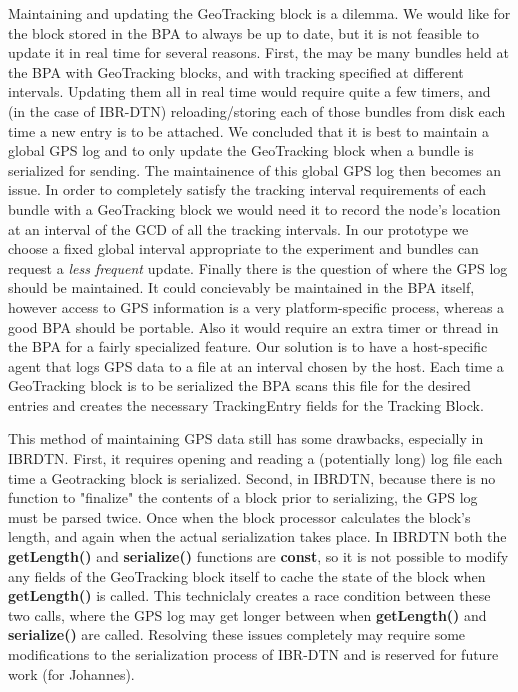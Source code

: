Maintaining and updating the GeoTracking block is a dilemma.  We would like for the block stored in the BPA to always be up to date, but it is not feasible to update it in real time for several reasons.  First, the may be many bundles held at the BPA with GeoTracking blocks, and with tracking specified at different intervals.  Updating them all in real time would require quite a few timers, and (in the case of IBR-DTN) reloading/storing each of those bundles from disk each time a new entry is to be attached.  We concluded that it is best to maintain a global GPS log and to only update the GeoTracking block when a bundle is serialized for sending.  The maintainence of this global GPS log then becomes an issue.  In order to completely satisfy the tracking interval requirements of each bundle with a GeoTracking block we would need it to record the node's location at an interval of the GCD of all the tracking intervals.  In our prototype we choose a fixed global interval appropriate to the experiment and bundles can request a {\it less frequent} update.  Finally there is the question of where the GPS log should be maintained.  It could concievably be maintained in the BPA itself, however access to GPS information is a very platform-specific process, whereas a good BPA should be portable.  Also it would require an extra timer or thread in the BPA for a fairly specialized feature.  Our solution is to have a host-specific agent that logs GPS data to a file at an interval chosen by the host.  Each time a GeoTracking block is to be serialized the BPA scans this file for the desired entries and creates the necessary TrackingEntry fields for the Tracking Block.

This method of maintaining GPS data still has some drawbacks, especially in IBRDTN.  First, it requires opening and reading a (potentially long) log file each time a Geotracking block is serialized.  Second, in IBRDTN, because there is no function to "finalize" the contents of a block prior to serializing, the GPS log must be parsed twice.  Once when the block processor calculates the block's length, and again when the actual serialization takes place.  In IBRDTN both the {\bf getLength()} and {\bf serialize()} functions are {\bf const}, so it is not possible to modify any fields of the GeoTracking block itself to cache the state of the block when {\bf getLength()} is called.  This techniclaly creates a race condition between these two calls, where the GPS log may get longer between when {\bf getLength()} and {\bf serialize()} are called.  Resolving these issues completely may require some modifications to the serialization process of IBR-DTN and is reserved for future work (for Johannes).

